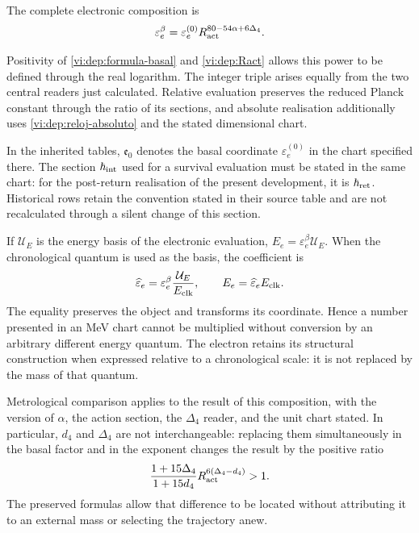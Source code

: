 \begin{definition}
The complete electronic composition is
\begin{equation}
 \varepsilon_e^\beta
  =\varepsilon_e^{(0)}
      R_{\rm act}^{80-54\alpha+6\Delta_4}.
 \label{vi:dep:electron-beta}
\end{equation}
\end{definition}
Positivity of \eqref{vi:dep:formula-basal} and
\eqref{vi:dep:Ract} allows this power to be defined through the
real logarithm. The integer triple arises equally from the two
central readers just calculated. Relative evaluation
preserves the reduced Planck constant through the ratio of its
sections, and absolute realisation additionally uses
\eqref{vi:dep:reloj-absoluto} and the stated dimensional chart.

In the inherited tables, \(\mathfrak e_0\) denotes the
basal coordinate \(\varepsilon_e^{(0)}\) in the chart
specified there. The section \(\hbar_{\rm int}\) used for a
survival evaluation must be stated in the same chart:
for the post-return realisation of the present development,
it is \(\hbar_{\rm ret}\). Historical rows retain the
convention stated in their source table and are not recalculated through a
silent change of this section.

If \(\mathcal U_E\) is the energy basis of the electronic
evaluation, \(E_e=\varepsilon_e^\beta\mathcal U_E\). When
the chronological quantum is used as the basis, the coefficient is
\[
 \widehat\varepsilon_e
   =\varepsilon_e^\beta\frac{\mathcal U_E}{E_{\rm clk}},
 \qquad E_e=\widehat\varepsilon_e E_{\rm clk}.
\]
The equality preserves the object and transforms its coordinate. Hence
a number presented in an MeV chart cannot be multiplied
without conversion by an arbitrary different energy quantum. The electron
retains its structural construction when expressed relative to a
chronological scale: it is not replaced by the mass of that quantum.

Metrological comparison applies to the result of this composition,
with the version of \(\alpha\), the action section, the
\(\Delta_4\) reader, and the unit chart stated. In particular,
\(d_4\) and \(\Delta_4\) are not interchangeable: replacing them
simultaneously in the basal factor and in the exponent changes the
result by the positive ratio
\[
 \frac{1+15\Delta_4}{1+15d_4}
 R_{\rm act}^{6(\Delta_4-d_4)}>1.
\]
The preserved formulas allow that difference to be located without
attributing it to an external mass or selecting the trajectory anew.
